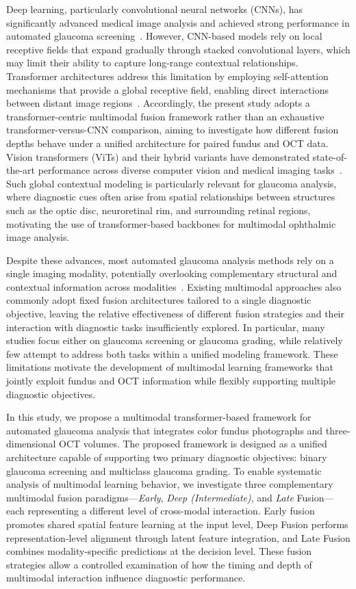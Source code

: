 \documentclass[preprint,12pt]{elsarticle}
\begin{document}
Deep learning, particularly convolutional neural networks (CNNs), has significantly advanced medical image analysis and achieved strong performance in automated glaucoma screening~\cite{cho2021deep,shyamalee2022attention}. However, CNN-based models rely on local receptive fields that expand gradually through stacked convolutional layers, which may limit their ability to capture long-range contextual relationships. Transformer architectures address this limitation by employing self-attention mechanisms that provide a global receptive field, enabling direct interactions between distant image regions~\cite{henry2022vision}. Accordingly, the present study adopts a transformer-centric multimodal fusion framework rather than an exhaustive transformer-versus-CNN comparison, aiming to investigate how different fusion depths behave under a unified architecture for paired fundus and OCT data. Vision transformers (ViTs) and their hybrid variants have demonstrated state-of-the-art performance across diverse computer vision and medical imaging tasks~\cite{fan2023detecting}. Such global contextual modeling is particularly relevant for glaucoma analysis, where diagnostic cues often arise from spatial relationships between structures such as the optic disc, neuroretinal rim, and surrounding retinal regions, motivating the use of transformer-based backbones for multimodal ophthalmic image analysis.

Despite these advances, most automated glaucoma analysis methods rely on a single imaging modality, potentially overlooking complementary structural and contextual information across modalities~\cite{dai2021transmed,meedeniya2025glaucoma}. Existing multimodal approaches also commonly adopt fixed fusion architectures tailored to a single diagnostic objective, leaving the relative effectiveness of different fusion strategies and their interaction with diagnostic tasks insufficiently explored. In particular, many studies focus either on glaucoma screening or glaucoma grading, while relatively few attempt to address both tasks within a unified modeling framework. These limitations motivate the development of multimodal learning frameworks that jointly exploit fundus and OCT information while flexibly supporting multiple diagnostic objectives.

In this study, we propose a multimodal transformer-based framework for automated glaucoma analysis that integrates color fundus photographs and three-dimensional OCT volumes. The proposed framework is designed as a unified architecture capable of supporting two primary diagnostic objectives: binary glaucoma screening and multiclass glaucoma grading. To enable systematic analysis of multimodal learning behavior, we investigate three complementary multimodal fusion paradigms—\textit{Early}, \textit{Deep (Intermediate)}, and \textit{Late} Fusion—each representing a different level of cross-modal interaction. Early fusion promotes shared spatial feature learning at the input level, Deep Fusion performs representation-level alignment through latent feature integration, and Late Fusion combines modality-specific predictions at the decision level. These fusion strategies allow a controlled examination of how the timing and depth of multimodal interaction influence diagnostic performance.
\end{document}
